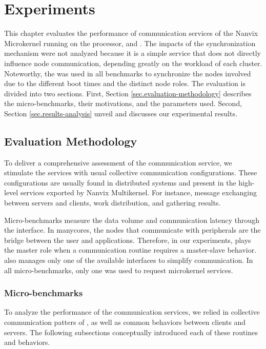 \chapter{Experiments}
\label{ch.experiments}

	This chapter evaluates the performance of communication services of
	the Nanvix Microkernel running on the \mppa processor, \ie \mailbox
	and \portal. The impacts of the synchronization mechanism were not
	analyzed because it is a simple service that does not directly
	influence node communication, depending greatly on the workload of
	each cluster. Noteworthy, the \sync was used in all benchmarks to
	synchronize the nodes involved due to the different boot times and
	the distinct node roles. The evaluation is divided into two sections.
	First, Section \autoref{sec.evaluation-methodology} describes the
	micro-benchmarks, their motivations, and the parameters used. Second,
	Section \autoref{sec.results-analysis} unveil and discusses our
	experimental results.

	\section{Evaluation Methodology}
	\label{sec.evaluation-methodology}

		To deliver a comprehensive assessment of the communication service, we
		stimulate the services with usual collective communication configurations.
		These configurations are usually found in distributed systems and present
		in the high-level services exported by Nanvix Multikernel. For instance,
		message exchanging between servers and clients, work distribution, and
		gathering results.

        Micro-benchmarks measure the data volume and communication latency
		through the \ioctl interface. In manycores, the nodes that communicate
		with peripherals are the bridge between the user and applications.
		Therefore, in our experiments, \iocluster plays the master role when a
		communication routine requires a master-slave behavior. \ioclusters also
		manages only one of the available interfaces to simplify communication.
		In all micro-benchmarks, only one \pe was used to request microkernel
		services.

		\subsection{Micro-benchmarks}

			To analyze the performance of the communication services, we
			relied in collective communication patters of \mpi, as well as
			common behaviors between clients and servers. The following
			subsections conceptually introduced each of these routines and
			behaviors.

